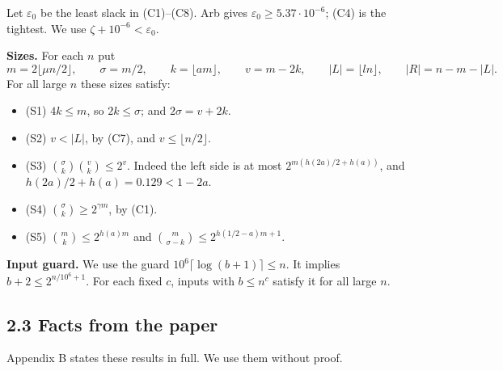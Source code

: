 \documentclass[10pt,a4paper]{article}
\begin{document}
Let $\varepsilon_0$ be the least slack in (C1)--(C8). Arb gives $\varepsilon_0 \ge 5.37\cdot 10^{-6}$; (C4) is the
tightest. We use $\zeta + 10^{-6} < \varepsilon_0$.

\textbf{Sizes.} For each $n$ put
\[m = 2\lfloor \mu n/2\rfloor,\qquad \sigma = m/2,\qquad k = \lfloor am\rfloor,\qquad v = m - 2k,\qquad
|L| = \lfloor ln\rfloor,\qquad |R| = n - m - |L|.\]
For all large $n$ these sizes satisfy:

\begin{itemize}
\item (S1) $4k \le m$, so $2k \le \sigma$; and $2\sigma = v + 2k$.
\item (S2) $v < |L|$, by (C7), and $v \le \lfloor n/2\rfloor$.
\item (S3) $\binom{\sigma}{k}\binom{v}{k} \le 2^{v}$. Indeed the left side is at most $2^{m(h(2a)/2 + h(a))}$, and
$h(2a)/2 + h(a) = 0.129 < 1 - 2a$.
\item (S4) $\binom{\sigma}{k} \ge 2^{\gamma m}$, by (C1).
\item (S5) $\binom{m}{k} \le 2^{h(a)m}$ and $\binom{m}{\sigma - k} \le 2^{h(1/2 - a)m + 1}$.
\end{itemize}

\textbf{Input guard.} We use the guard $10^6\lceil\log(b+1)\rceil \le n$. It implies $b + 2 \le 2^{n/10^6 + 1}$. For each
fixed $c$, inputs with $b \le n^c$ satisfy it for all large $n$.

\subsection*{2.3 Facts from the paper}

Appendix B states these results in full. We use them without proof.
\end{document}
